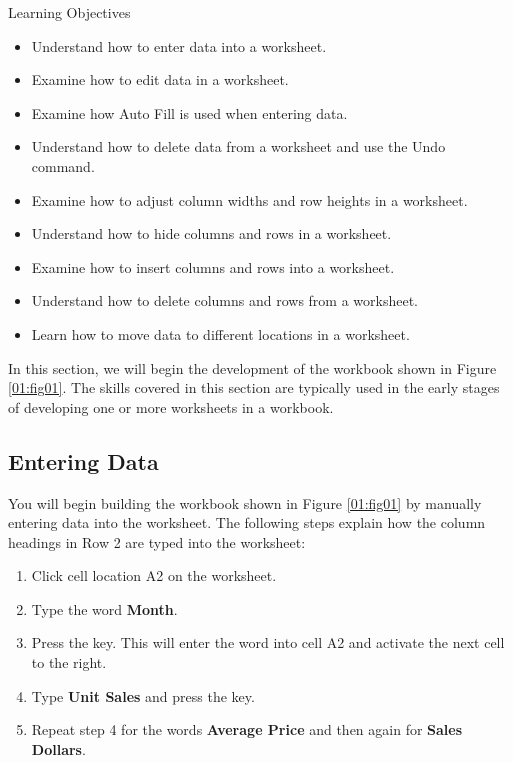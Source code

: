 \begin{center}
	\begin{objbox}{Learning Objectives}
		\begin{itemize}
			\setlength{\itemsep}{0pt}
			\setlength{\parskip}{0pt}
			\setlength{\parsep}{0pt}
			
			\item Understand how to enter data into a worksheet.
			\item Examine how to edit data in a worksheet.
			\item Examine how Auto Fill is used when entering data.
			\item Understand how to delete data from a worksheet and use the Undo command.
			\item Examine how to adjust column widths and row heights in a worksheet.
			\item Understand how to hide columns and rows in a worksheet.
			\item Examine how to insert columns and rows into a worksheet.
			\item Understand how to delete columns and rows from a worksheet.
			\item Learn how to move data to different locations in a worksheet.

		\end{itemize}
	\end{objbox}
\end{center}

In this section, we will begin the development of the workbook shown in Figure \ref{01:fig01}. The skills covered in this section are typically used in the early stages of developing one or more worksheets in a workbook.

\subsection{Entering Data}

You will begin building the workbook shown in Figure \ref{01:fig01} by manually entering data into the worksheet. The following steps explain how the column headings in Row 2 are typed into the worksheet:

\begin{enumerate}
	\item Click cell location \textsf{A2} on the worksheet.
	\item Type the word \textbf{Month}.
	\item Press the  key. This will enter the word into cell \textsf{A2} and activate the next cell to the right.
	\item Type \textbf{Unit Sales} and press the  key.
	\item Repeat step 4 for the words \textbf{Average Price} and then again for \textbf{Sales Dollars}.
\end{enumerate}

